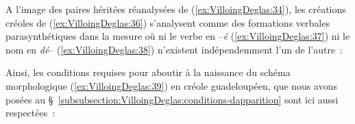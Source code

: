 \documentclass[output=paper]{langsci/langscibook}
\begin{document}
A l'image des paires héritées réanalysées de (\ref{ex:VilloingDeglas:34}), les créations créoles
de (\ref{ex:VilloingDeglas:36}) s'analysent comme des formations verbales parasynthétiques dans
la mesure où ni le verbe en --\emph{é} (\ref{ex:VilloingDeglas:37}) ni le nom en \emph{dé}-- (\ref{ex:VilloingDeglas:38})
n'existent indépendemment l'un de l'autre~:

\ea \label{ex:VilloingDeglas:37}
      \z
\ex \label{ex:VilloingDeglas:38}
      \z
\z

Ainsi, les conditions requises pour aboutir à la naissance du schéma
morphologique (\ref{ex:VilloingDeglas:39}) en créole guadeloupéen, que nous avons posées au 
§~\ref{subsubsection:VilloingDeglas:conditions-dapparition}
sont ici aussi respectées~:
\end{document}
